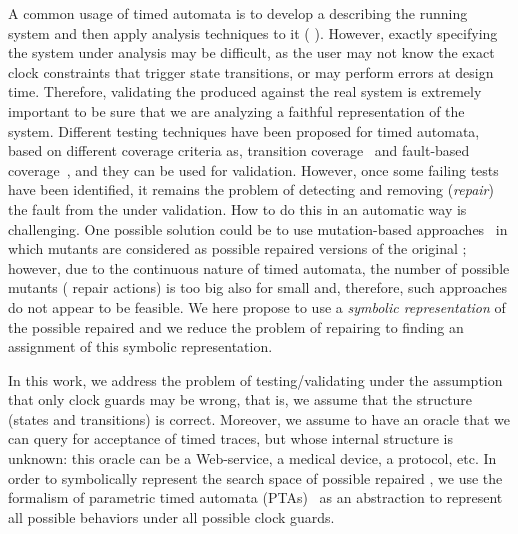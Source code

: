\begin{tikzborder}{\cite{Gargantini16:validation}}
\begin{tikzborder}{\cite{gargantini_combinatorial_2017}}
\begin{tikzborder}{\cite{garn2019}}
\begin{tikzborder}{\cite{arcaini2019achieving}}
\begin{tikzborder}{\cite{arcaini2019varivolution}}
A common usage of timed automata
 is to develop a \ta describing the running system and then apply analysis techniques to it (\eg{} \cite{BY03}). However, exactly specifying the system under analysis may be difficult, as the user may not know the exact clock constraints that trigger state transitions, or may perform errors at design time. Therefore, validating the produced \ta against the real system is extremely important to be sure that we are analyzing a faithful representation of the system. Different testing techniques have been proposed for timed automata, based on different coverage criteria as, \eg{} transition coverage~\cite{springintveld2001testing} and fault-based coverage~\cite{Aichernig2015MMT,aichernig2013time}, and they can be used for \ta validation. However, once some failing tests have been identified, it remains the problem of detecting and removing ({\it repair}) the fault from the \ta under validation. How to do this in an automatic way is challenging. One possible solution could be to use mutation-based approaches~\cite{Aichernig2015MMT,aichernig2013time} in which mutants are considered as possible repaired versions of the original \ta; however, due to the continuous nature of timed automata, the number of possible mutants (\ie{} repair actions) is too big also for small \tas and, therefore, such approaches do not appear to be feasible. We here propose to use a {\it symbolic representation} of the possible repaired \tas and we reduce the problem of repairing to finding an assignment of this symbolic representation.

In this work, we address the problem of testing/validating \tas under the assumption that only clock guards may be wrong, that is, we assume that the structure (states and transitions) is correct.
Moreover, we assume to have an oracle that we can query for acceptance of timed traces, but whose internal structure is unknown: this oracle can be a Web-service, a medical device, a protocol, etc. In order to symbolically represent the search space of possible repaired \tas, we use the formalism of parametric timed automata (PTAs)~\cite{AHV93} as an abstraction to represent all possible behaviors under all possible clock guards.


\end{tikzborder}
\end{tikzborder}
\end{tikzborder}
\end{tikzborder}
\end{tikzborder}

